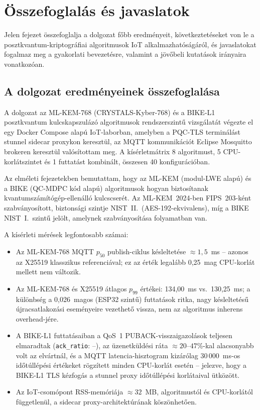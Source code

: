 \chapter{Összefoglalás és javaslatok}

Jelen fejezet összefoglalja a dolgozat főbb eredményeit, következtetéseket von le a
posztkvantum-kriptográfiai algoritmusok IoT alkalmazhatóságáról, és javaslatokat
fogalmaz meg a gyakorlati bevezetésre, valamint a jövőbeli kutatások irányaira vonatkozóan.

\section{A dolgozat eredményeinek összefoglalása}

A dolgozat az ML-KEM-768 (CRYSTALS-Kyber-768) és a BIKE-L1 posztkvantum kulcskapszulázó
algoritmusok rendszerszintű vizsgálatát végezte el egy Docker Compose alapú IoT-laborban,
amelyben a PQC-TLS terminálást stunnel sidecar proxykon keresztül, az MQTT kommunikációt
Eclipse Mosquitto brokeren keresztül valósítottam meg. A kísérletmátrix 8 algoritmust, 5
CPU-korlátszintet és 1 futtatást kombinált, összesen 40 konfigurációban.

Az elméleti fejezetekben bemutattam, hogy az ML-KEM (modul-LWE alapú) és a BIKE (QC-MDPC
kód alapú) algoritmusok hogyan biztosítanak kvantumszámítógép-ellenálló kulcscserét. Az
ML-KEM~2024-ben FIPS~203-ként szabványosított, biztonsági szintje NIST~II.\ (AES-192-ekvivalens),
míg a BIKE NIST~I.\ szintű jelölt, amelynek szabványosítása folyamatban van.

A kísérleti mérések legfontosabb számai:
\begin{itemize}
    \item Az ML-KEM-768 MQTT $p_{50}$ publish-ciklus késleltetése $\approx 1{,}5$~ms --
          azonos az X25519 klasszikus referenciával; ez az érték legalább 0,25~mag CPU-korlát
          mellett nem változik.
    \item Az ML-KEM-768 és X25519 átlagos $p_{99}$ értékei: 134,00~ms vs.\ 130,25~ms; a
          különbség a 0,026~magos (ESP32 szintű) futtatások ritka, nagy késleltetésű
          újracsatlakozási eseményeire vezethető vissza, nem az algoritmus inherens overhead-jére.
    \item A BIKE-L1 futtatásaiban a QoS~1 PUBACK-visszaigazolások teljesen elmaradtak
          (\texttt{ack\_ratio}: --), az üzenetküldési ráta $\approx 20$--$47$\%-kal alacsonyabb
          volt az elvártnál, és a MQTT latencia-hisztogram kizárólag 30\,000~ms-os
          időtúllépési értékeket rögzített minden CPU-korlát esetén -- jelezve,
          hogy a BIKE-L1 TLS kézfogás a stunnel proxy időtúllépési korlátaival ütközött.
    \item Az IoT-csomópont RSS-memóriája $\approx 32$~MB, algoritmustól és CPU-korlától
          függetlenül, a sidecar proxy-architektúrának köszönhetően.
\end{itemize}

